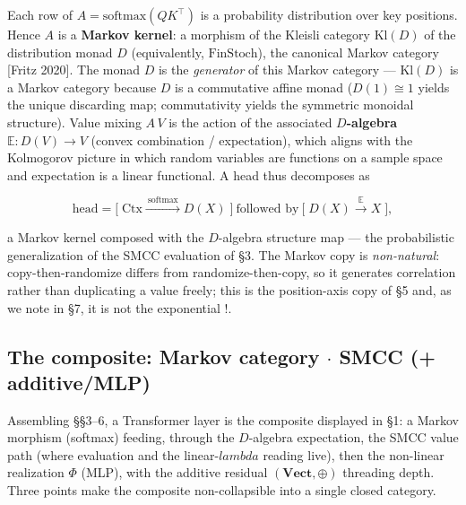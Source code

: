 \documentclass[a4paper,11pt]{article}
\begin{document}
Each row of \(A=\mathrm{softmax}(QK^\top)\) is a probability
distribution over key positions. Hence \(A\) is a \textbf{Markov
kernel}: a morphism of the Kleisli category \(\mathrm{Kl}(D)\) of the
distribution monad \(D\) (equivalently, \(\mathrm{FinStoch}\)), the
canonical Markov category {[}Fritz 2020{]}. The monad \(D\) is the
\emph{generator} of this Markov category --- \(\mathrm{Kl}(D)\) is a
Markov category because \(D\) is a commutative affine monad
(\(D(1)\cong 1\) yields the unique discarding map; commutativity yields
the symmetric monoidal structure). Value mixing \(A\,V\) is the action
of the associated \textbf{\(D\)-algebra} \(\mathbb{E}:D(V)\to V\)
(convex combination / expectation), which aligns with the Kolmogorov
picture in which random variables are functions on a sample space and
expectation is a linear functional. A head thus decomposes as

\[\text{head}=\Big[\;\mathrm{Ctx}\xrightarrow{\ \text{softmax}\ } D(X)\;\Big]\ \text{followed by}\ \Big[\;D(X)\xrightarrow{\ \mathbb{E}\ } X\;\Big],\]

a Markov kernel composed with the \(D\)-algebra structure map --- the
probabilistic generalization of the SMCC evaluation of §3. The Markov
copy is \emph{non-natural}: copy-then-randomize differs from randomize-then-copy, so it generates correlation rather than duplicating
a value freely; this is the position-axis copy of §5 and, as we note in §7, it is not the exponential \(!\).

\hypertarget{the-composite-markov-category-smcc-additivemlp}{%
\subsection{The composite: Markov category $\cdot$ SMCC (+ additive/MLP)}\label{the-composite-markov-category-smcc-additivemlp}}

Assembling §§3--6, a Transformer layer is the composite displayed in §1:
a Markov morphism (softmax) feeding, through the \(D\)-algebra expectation, the SMCC value path (where evaluation and the linear-$lambda$ reading live), then the non-linear realization \(\Phi\) (MLP), with the
additive residual \((\mathbf{Vect},\oplus)\) threading depth. Three
points make the composite non-collapsible into a single closed category.
\end{document}
